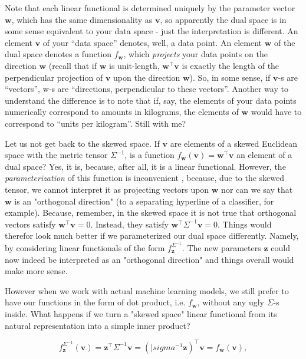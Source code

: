 \documentclass{article}
\begin{document}
Note that each linear functional is determined uniquely by the parameter vector $\bm{w}$, which has the same dimensionality as $\bm{v}$, so apparently the dual space is in some sense equivalent to your data space - just the interpretation is different. An element $\bm{v}$ of your “data space” denotes, well, a data point. An element $\bm{w}$ of the dual space denotes a function $f_{\bm{w}}$, which \textit{projects} your data points on the direction $\bm{w}$ (recall that if $\bm{w}$ is unit-length, $\bm{w}^{\intercal}\bm{v}$ is exactly the length of the perpendicular projection of $\bm{v}$ upon the direction $\bm{w}$). So, in some sense, if $\bm{v}$-s are “vectors”, w-s are “directions, perpendicular to these vectors”. Another way to understand the difference is to note that if, say, the elements of your data points numerically correspond to amounts in kilograms, the elements of $\bm{w}$ would have to correspond to “units per kilogram”. Still with me?\medskip

Let us not get back to the skewed space. If $\bm{v}$ are elements of a skewed Euclidean space with the metric tensor $\Sigma^{-1}$, is a function $f_{\bm{w}}(\bm{v}) = \bm{w}^{\intercal}\bm{v}$ an element of a dual space? Yes, it is, because, after all, it is a linear functional. However, the \textit{parameterization} of this function is inconvenient , because, due to the skewed tensor, we cannot interpret it as projecting vectors upon $\bm{w}$ nor can we say that $\bm{w}$ is an "orthogonal direction" (to a separating hyperline of a classifier, for example). Because, remember, in the skewed space it is not true that orthogonal vectors satisfy $\bm{w}^{\intercal}\bm{v} = 0$. Instead, they satisfy $\bm{w}^{\intercal}\Sigma^{-1}\bm{v} = 0$. Things would therefor look much better if we parameterized our dual space differently. Namely, by considering linear functionals of the form $f_{\bm{z}}^{\Sigma^{-1}}$. The new parameters $\bm{z}$ could now indeed be interpreted as an "orthogonal direction" and things overall would make more sense.\medskip

However when we work with actual machine learning models, we still prefer to have our functions in the form of dot product, i.e. $f_{\bm{w}}$, without any ugly $\Sigma$-s inside. What happens if we turn a "skewed space" linear functional from its natural representation into a simple inner product?

\begin{equation}
  f_{\bm{z}}^{\Sigma^{-1}}(\bm{v}) 
  = \bm{z}^{\intercal}\Sigma^{-1}\bm{v} 
  = \left(|sigma^{-1}\bm{z}\right)^{\intercal}\bm{v}
  = f_{\bm{w}}(\bm{v}),
\end{equation}
\end{document}
